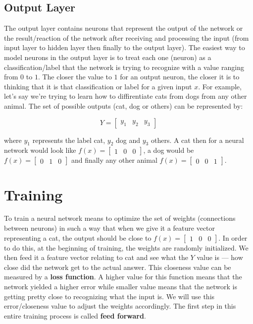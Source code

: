 \documentclass[a4paper]{article}
\begin{document}
\subsection{Output Layer}
The output layer contains neurons that represent the output of the network or the result/reaction of the network after receiving and processing the input (from input layer to hidden layer then finally to the output layer). The easiest way to model neurons in the output layer is to treat each one (neuron) as a classification/label that the network is trying to recognize with a value ranging from $0$ to $1$. The closer the value to $1$ for an output neuron, the closer it is to thinking that it is that classification or label for a given input $x$. For example, let's say we're trying to learn how to diffirentiate cats from dogs from any other animal. The set of possible outputs (cat, dog or others) can be represented by:

\begin{equation}
  Y=\begin{bmatrix}
    y_{1} &   y_{2} & y_{3}
  \end{bmatrix}
\end{equation}

where $y_{1}$ represents the label cat, $y_{2}$ dog and $y_{3}$ others. A cat then for a neural network would look like $f(x) = \begin{bmatrix} 1 &   0 & 0 \end{bmatrix}$, a dog would be $f(x) = \begin{bmatrix} 0 &  1 & 0 \end{bmatrix}$ and finally any other animal $f(x) = \begin{bmatrix} 0 & 0 & 1 \end{bmatrix}$.

\section{Training}

To train a neural network means to optimize the set of weights (connections between neurons) in such a way that when we give it a feature vector representing a cat, the output should be close to $f(x) = \begin{bmatrix} 1 & 0 & 0 \end{bmatrix}$. In order to do this, at the beginning of training, the weights are randomly initialized. We then feed it a feature vector relating to cat and see what the $Y$ value is --- how close did the network get to the actual answer. This closeness value can be measured by a \textbf{loss function}. A higher value for this function means that the network yielded a higher error while smaller value means that the network is getting pretty close to recognizing what the input is. We will use this error/closeness value to adjust the weights accordingly. The first step in this entire training process is called \textbf{feed forward}. 
\end{document}
